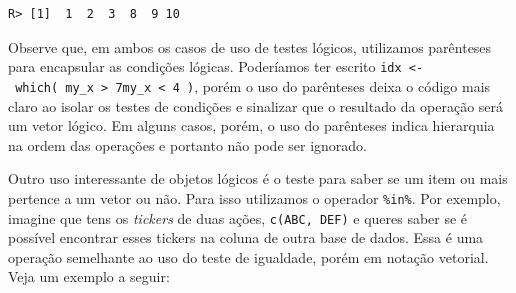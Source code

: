 \documentclass[
  11pt,
]{book}
\newenvironment{Shaded}{\begin{snugshade}}{\end{snugshade}}
\newcommand{\AttributeTok}[1]{\textcolor[rgb]{0.61,0.61,0.61}{#1}}
\newcommand{\CommentTok}[1]{\textcolor[rgb]{0.37,0.37,0.37}{\textit{#1}}}
\newcommand{\ConstantTok}[1]{\textcolor[rgb]{0,0,0}{#1}}
\newcommand{\DecValTok}[1]{\textcolor[rgb]{0.06,0.06,0.06}{#1}}
\newcommand{\FloatTok}[1]{\textcolor[rgb]{0.06,0.06,0.06}{#1}}
\newcommand{\FunctionTok}[1]{\textcolor[rgb]{0,0,0}{#1}}
\newcommand{\NormalTok}[1]{#1}
\newcommand{\OtherTok}[1]{\textcolor[rgb]{0.37,0.37,0.37}{#1}}
\newcommand{\SpecialCharTok}[1]{\textcolor[rgb]{0,0,0}{#1}}
\newcommand{\StringTok}[1]{\textcolor[rgb]{0.5,0.5,0.5}{#1}}
\begin{document}
\begin{verbatim}
R> [1]  1  2  3  8  9 10
\end{verbatim}

Observe que, em ambos os casos de uso de testes lógicos, utilizamos parênteses para encapsular as condições lógicas. Poderíamos ter escrito \texttt{idx\ \textless{}-\ which(\ my\_x\ \textgreater{}\ 7\textbar{}my\_x\ \textless{}\ 4\ )}, porém o uso do parênteses deixa o código mais claro ao isolar os testes de condições e sinalizar que o resultado da operação será um vetor lógico. Em alguns casos, porém, o uso do parênteses indica hierarquia na ordem das operações e portanto não pode ser ignorado.

Outro uso interessante de objetos lógicos é o teste para saber se um item ou mais pertence a um vetor ou não. Para isso utilizamos o operador \texttt{\%in\%}. Por exemplo, imagine que tens os \emph{tickers} de duas ações, \texttt{c(\textquotesingle{}ABC\textquotesingle{},\ \textquotesingle{}DEF\textquotesingle{})} e queres saber se é possível encontrar esses tickers na coluna de outra base de dados. Essa é uma operação semelhante ao uso do teste de igualdade, porém em notação vetorial. Veja um exemplo a seguir:

\begin{Shaded}
\end{Shaded}
\end{document}
